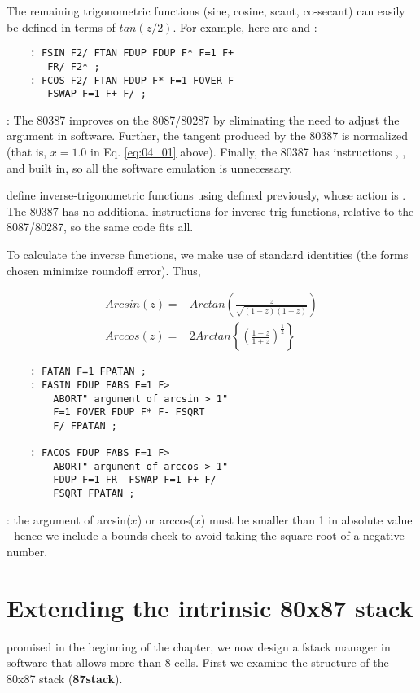 The remaining trigonometric functions (sine, cosine, scant, co-secant) can easily be defined in terms of $tan(z /2)$. For example, here are  and :

\begin{lstlisting}
    : FSIN F2/ FTAN FDUP FDUP F* F=1 F+
       FR/ F2* ;
    : FCOS F2/ FTAN FDUP F* F=1 FOVER F-
       FSWAP F=1 F+ F/ ;
\end{lstlisting}

\leftbar[1\linewidth]
\Note: The 80387 improves on the 8087/80287 by eliminating the need to adjust the argument in software. Further, the tangent produced by the 80387 is normalized (that is, $x = 1.0$ in Eq. \ref{eq:04_01} above). Finally, the 80387 has instructions , , and  built in, so all the software emulation is unnecessary.
\endleftbar

 define inverse-trigonometric functions using  defined previously, whose action is . The 80387 has no additional instructions for inverse trig functions, relative to the 8087/80287, so the same code fits all.

To calculate the inverse functions, we make use of standard identities (the forms chosen minimize roundoff error). Thus,

\begin{align}
    Arcsin(z) =& Arctan\left(\frac{z}{\sqrt{(1-z)(1+z)}}\right) \\
    Arccos(z) =& 2 Arctan\left \{\left (\frac{1-z}{1+z}\right)^{\frac{1}{2}}\right \}
\end{align}

\begin{lstlisting}
    : FATAN F=1 FPATAN ;
    : FASIN FDUP FABS F=1 F>
        ABORT" argument of arcsin > 1"
        F=1 FOVER FDUP F* F- FSQRT
        F/ FPATAN ;

    : FACOS FDUP FABS F=1 F>
        ABORT" argument of arccos > 1"
        FDUP F=1 FR- FSWAP F=1 F+ F/
        FSQRT FPATAN ;
\end{lstlisting}

\leftbar[1\linewidth]
\Note: the argument of arcsin($x$) or arccos($x$) must be smaller than 1 in absolute value - hence we include a bounds check to avoid taking the square root of a negative number.
\endleftbar

\section{Extending the intrinsic 80x87 stack}
 promised in the beginning of the chapter, we now design a fstack manager in software that allows more than 8 cells. First we examine the structure of the 80x87 stack (\textbf{87stack}).


